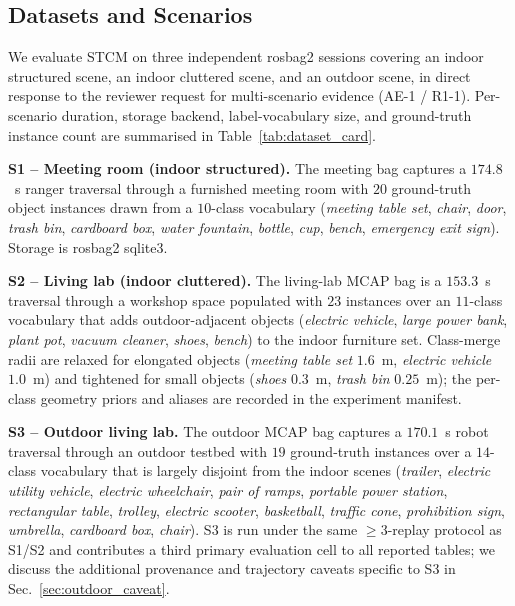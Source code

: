 \subsection{Datasets and Scenarios}
\label{sec:datasets}

We evaluate STCM on three independent rosbag2 sessions covering an indoor
structured scene, an indoor cluttered scene, and an outdoor scene, in
direct response to the reviewer request for multi-scenario evidence
(AE-1 / R1-1). Per-scenario duration, storage backend, label-vocabulary
size, and ground-truth instance count are summarised in
Table~\ref{tab:dataset_card}.

\noindent\textbf{S1 -- Meeting room (indoor structured).}
The meeting bag captures a $174.8$~s ranger traversal through a
furnished meeting room with $20$ ground-truth object instances drawn
from a $10$-class vocabulary (\emph{meeting table set}, \emph{chair},
\emph{door}, \emph{trash bin}, \emph{cardboard box}, \emph{water
fountain}, \emph{bottle}, \emph{cup}, \emph{bench}, \emph{emergency
exit sign}). Storage is rosbag2 sqlite3.

\noindent\textbf{S2 -- Living lab (indoor cluttered).}
The living-lab MCAP bag is a $153.3$~s traversal through a workshop
space populated with $23$ instances over an $11$-class vocabulary that
adds outdoor-adjacent objects (\emph{electric vehicle}, \emph{large
power bank}, \emph{plant pot}, \emph{vacuum cleaner}, \emph{shoes},
\emph{bench}) to the indoor furniture set. Class-merge radii are
relaxed for elongated objects (\emph{meeting table set} $1.6$~m,
\emph{electric vehicle} $1.0$~m) and tightened for small objects
(\emph{shoes} $0.3$~m, \emph{trash bin} $0.25$~m); the per-class
geometry priors and aliases are recorded in the experiment manifest.

\noindent\textbf{S3 -- Outdoor living lab.}
The outdoor MCAP bag captures a $170.1$~s robot traversal through an
outdoor testbed with $19$ ground-truth instances over a $14$-class
vocabulary that is largely disjoint from the indoor scenes
(\emph{trailer}, \emph{electric utility vehicle},
\emph{electric wheelchair}, \emph{pair of ramps},
\emph{portable power station}, \emph{rectangular table},
\emph{trolley}, \emph{electric scooter}, \emph{basketball},
\emph{traffic cone}, \emph{prohibition sign}, \emph{umbrella},
\emph{cardboard box}, \emph{chair}). S3 is run under the same
$\geq 3$-replay protocol as S1/S2 and contributes a third primary
evaluation cell to all reported tables; we discuss the additional
provenance and trajectory caveats specific to S3 in
Sec.~\ref{sec:outdoor_caveat}.

